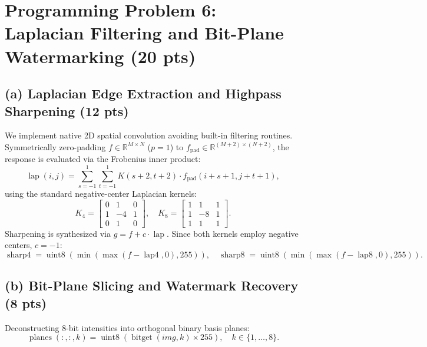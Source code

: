 \documentclass[11pt,a4paper]{article}
\begin{document}
\section{Programming Problem 6: Laplacian Filtering and Bit-Plane Watermarking (20 pts)}

\subsection{(a) Laplacian Edge Extraction and Highpass Sharpening (12 pts)}
We implement native 2D spatial convolution avoiding built-in filtering routines. Symmetrically zero-padding $f \in \mathbb{R}^{M \times N}$ ($p = 1$) to $f_{\text{pad}} \in \mathbb{R}^{(M+2) \times (N+2)}$, the response is evaluated via the Frobenius inner product:
\begin{equation}
\operatorname{lap}(i, j) = \sum_{s=-1}^1 \sum_{t=-1}^1 K(s+2, t+2) \cdot f_{\text{pad}}(i+s+1, j+t+1),
\end{equation}
using the standard negative-center Laplacian kernels:
\begin{equation}
K_4 = \begin{bmatrix} 0 & 1 & 0 \\ 1 & -4 & 1 \\ 0 & 1 & 0 \end{bmatrix}, \quad
K_8 = \begin{bmatrix} 1 & 1 & 1 \\ 1 & -8 & 1 \\ 1 & 1 & 1 \end{bmatrix}.
\end{equation}
Sharpening is synthesized via $g = f + c \cdot \operatorname{lap}$. Since both kernels employ negative centers, $c = -1$:
\begin{equation}
\operatorname{sharp4} = \operatorname{uint8}\left(\min\left(\max(f - \operatorname{lap4}, 0), 255\right)\right), \quad
\operatorname{sharp8} = \operatorname{uint8}\left(\min\left(\max(f - \operatorname{lap8}, 0), 255\right)\right).
\end{equation}

\subsection{(b) Bit-Plane Slicing and Watermark Recovery (8 pts)}
Deconstructing 8-bit intensities into orthogonal binary basis planes:
\begin{equation}
\operatorname{planes}(:, :, k) = \operatorname{uint8}\left(\operatorname{bitget}(img, k) \times 255\right), \quad k \in \{1, \dots, 8\}.
\end{equation}
\end{document}
